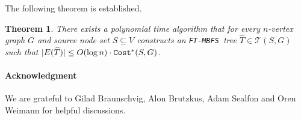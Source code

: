 \documentclass[12pt]{article}
\newtheorem{theorem}{Theorem}[section]
\def\Cost{\mbox{\tt Cost}}
\def\FTMBFS{\mbox{\tt FT-MBFS}}
\begin{document}
The following theorem is established.

\begin{theorem}
\label{thm:edgeonef-approx}
There exists a polynomial time algorithm that for every $n$-vertex graph $G$
and source node set $S \subseteq V$ constructs an \FTMBFS\ tree
$\widehat{T} \in \mathcal{T}(S,G)$
such that $|E(\widehat{T})|\leq O(\log n)\cdot \Cost^*(S, G)$.
\end{theorem}



\bigskip
\paragraph{Acknowledgment}
We are grateful to Gilad Braunschvig, Alon Brutzkus, Adam Sealfon
and Oren Weimann for helpful discussions.

\clearpage
\end{document}
